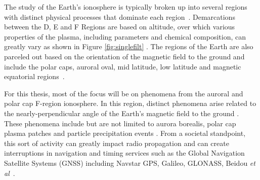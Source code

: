 %
% 
%

The study of the Earth's ionosphere is typically broken up into several regions with distinct physical processes that dominate each region~\citep{kellybook}. Demarcations between the D, E and F Regions are based on altitude, over which various properties of the plasma, including parameters and chemical composition, can greatly vary as shown in Figure \ref{fig:singlefilt} \citep{kellybook}. The regions of the Earth are also parceled out based on the orientation of the magnetic field to the ground and include the polar caps, auroral oval, mid latitude, low latitude and magnetic equatorial regions~\citep{schunk2004ionospheres}.

For this thesis, most of the focus will be on phenomena from the auroral and polar cap F-region ionosphere. In this region, distinct phenomena arise related to the nearly-perpendicular angle of the Earth's magnetic field to the ground \citep{schunk2004ionospheres}. These phenomena include but are not limited to aurora borealis, polar cap plasma patches and particle precipitation events \citep{Perry:2015jf,Dahlgren:2013ip,dahlgren2012di,Dahlgren:2012dq,semeter:plasmatransport2012}. From a societal standpoint, this sort of activity can greatly impact radio propagation and can create interruptions in navigation and timing services such as the Global Navigation Satellite Systems (GNSS) including Navstar GPS, Galileo, GLONASS, Beidou \textit{et al}~\citep{Jiao:2013ei,hunsucker2007high}.


